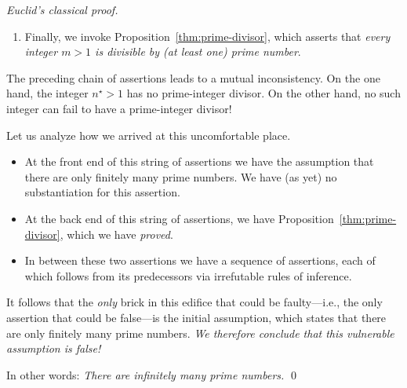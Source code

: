 \begin{proof} [Euclid's classical proof]
\begin{enumerate}
\medskip\item
Finally, we invoke Proposition~\ref{thm:prime-divisor}, which asserts that {\em every integer $m >1$ is divisible by (at least one) prime number}.
\end{enumerate}
The preceding chain of assertions leads to a mutual inconsistency.  On the one hand, the integer $n^\star >1$ has no prime-integer divisor. On the other hand, no such integer can fail to have a prime-integer divisor!

\medskip

Let us analyze how we arrived at this uncomfortable place.
\begin{itemize}
\item
At the front end of this string of assertions we have the assumption that there are only finitely many prime numbers.  We have (as yet) no substantiation for this assertion.
\medskip\item
At the back end of this string of assertions, we have Proposition~\ref{thm:prime-divisor}, which we have {\em proved}.

\medskip\item
In between these two assertions we have a sequence of assertions, each of which follows from its predecessors via irrefutable rules of inference.
\end{itemize}
It follows that the {\em only} brick in this edifice that could be faulty---i.e., the only assertion that could be false---is the initial assumption, which states that there are only finitely many prime
numbers.  {\em We therefore conclude that this vulnerable assumption is false!} 

\smallskip

In other words: {\em There are infinitely many prime numbers.}  \qed
\end{proof}


\smallskip


